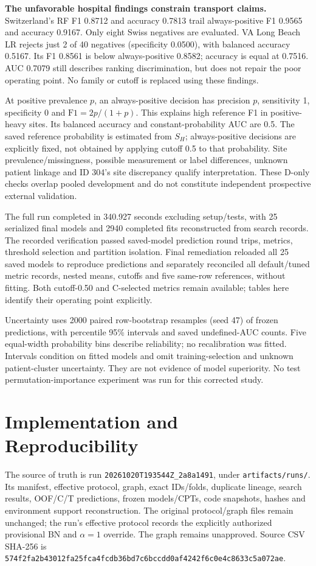 \documentclass[conference]{IEEEtran}
\begin{document}
\textbf{The unfavorable hospital findings constrain transport claims.} Switzerland's RF F1 0.8712 and accuracy 0.7813 trail always-positive F1 0.9565 and accuracy 0.9167. Only eight Swiss negatives are evaluated. VA Long Beach LR rejects just 2 of 40 negatives (specificity 0.0500), with balanced accuracy 0.5167. Its F1 0.8561 is below always-positive 0.8582; accuracy is equal at 0.7516. AUC 0.7079 still describes ranking discrimination, but does not repair the poor operating point. No family or cutoff is replaced using these findings.

At positive prevalence $p$, an always-positive decision has precision $p$, sensitivity 1, specificity 0 and $\mathrm{F1}=2p/(1+p)$. This explains high reference F1 in positive-heavy sites. Its balanced accuracy and constant-probability AUC are 0.5. The saved reference probability is estimated from $S_H$; always-positive decisions are explicitly fixed, not obtained by applying cutoff 0.5 to that probability. Site prevalence/missingness, possible measurement or label differences, unknown patient linkage and ID 304's site discrepancy qualify interpretation. These D-only checks overlap pooled development and do not constitute independent prospective external validation.


The full run completed in 340.927 seconds excluding setup/tests, with 25 serialized final models and 2940 completed fits reconstructed from search records. The recorded verification passed saved-model prediction round trips, metrics, threshold selection and partition isolation. Final remediation reloaded all 25 saved models to reproduce predictions and separately reconciled all default/tuned metric records, nested means, cutoffs and five same-row references, without fitting. Both cutoff-0.50 and C-selected metrics remain available; tables here identify their operating point explicitly.

Uncertainty uses 2000 paired row-bootstrap resamples (seed 47) of frozen predictions, with percentile 95\% intervals and saved undefined-AUC counts. Five equal-width probability bins describe reliability; no recalibration was fitted. Intervals condition on fitted models and omit training-selection and unknown patient-cluster uncertainty. They are not evidence of model superiority. No test permutation-importance experiment was run for this corrected study.

\section{Implementation and Reproducibility}
The source of truth is run \texttt{20261020T193544Z\_2a8a1491}, under \texttt{artifacts/runs/}. Its manifest, effective protocol, graph, exact IDs/folds, duplicate lineage, search results, OOF/C/T predictions, frozen models/CPTs, code snapshots, hashes and environment support reconstruction. The original protocol/graph files remain unchanged; the run's effective protocol records the explicitly authorized provisional BN and $\alpha=1$ override. The graph remains unapproved. Source CSV SHA-256 is\newline
{\scriptsize\texttt{574f2fa2b43012fa25fca4fcdb36bd7c6b}\newline\texttt{ccdd0af4242f6c0e4c8633c5a072ae}}.
\end{document}
